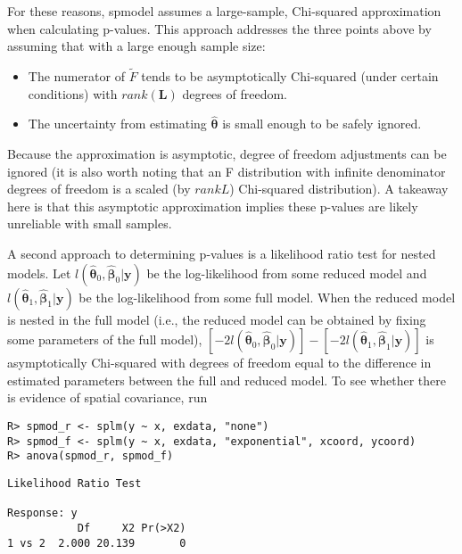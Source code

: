 \documentclass{article}
\providecommand{\tightlist}{%
  \setlength{\itemsep}{0pt}\setlength{\parskip}{0pt}}
\begin{document}
For these reasons, spmodel assumes a large-sample, Chi-squared
approximation when calculating p-values. This approach addresses the
three points above by assuming that with a large enough sample size:

\begin{itemize}
\tightlist
\item
  The numerator of \(\tilde{F}\) tends to be asymptotically Chi-squared
  (under certain conditions) with \(rank(\mathbf{L})\) degrees of
  freedom.
\item
  The uncertainty from estimating \(\bm{\hat{\theta}}\) is small enough
  to be safely ignored.
\end{itemize}

Because the approximation is asymptotic, degree of freedom adjustments
can be ignored (it is also worth noting that an F distribution with
infinite denominator degrees of freedom is a scaled (by \(rank{L}\))
Chi-squared distribution). A takeaway here is that this asymptotic
approximation implies these p-values are likely unreliable with small
samples.

A second approach to determining p-values is a likelihood ratio test for
nested models. Let
\(l(\bm{\hat{\theta}}_0, \bm{\hat{\beta}}_0 | \mathbf{y} )\) be the
log-likelihood from some reduced model and
\(l(\bm{\hat{\theta}}_1, \bm{\hat{\beta}}_1 | \mathbf{y} )\) be the
log-likelihood from some full model. When the reduced model is nested in
the full model (i.e., the reduced model can be obtained by fixing some
parameters of the full model),
\([-2l(\bm{\hat{\theta}}_0, \bm{\hat{\beta}}_0 | \mathbf{y} )] - [-2l(\bm{\hat{\theta}}_1, \bm{\hat{\beta}}_1 | \mathbf{y} )]\)
is asymptotically Chi-squared with degrees of freedom equal to the
difference in estimated parameters between the full and reduced model.
To see whether there is evidence of spatial covariance, run

\begin{verbatim}
R> spmod_r <- splm(y ~ x, exdata, "none")
R> spmod_f <- splm(y ~ x, exdata, "exponential", xcoord, ycoord)
R> anova(spmod_r, spmod_f)
\end{verbatim}

\begin{verbatim}
Likelihood Ratio Test

Response: y
           Df     X2 Pr(>X2)
1 vs 2  2.000 20.139       0
\end{verbatim}
\end{document}
